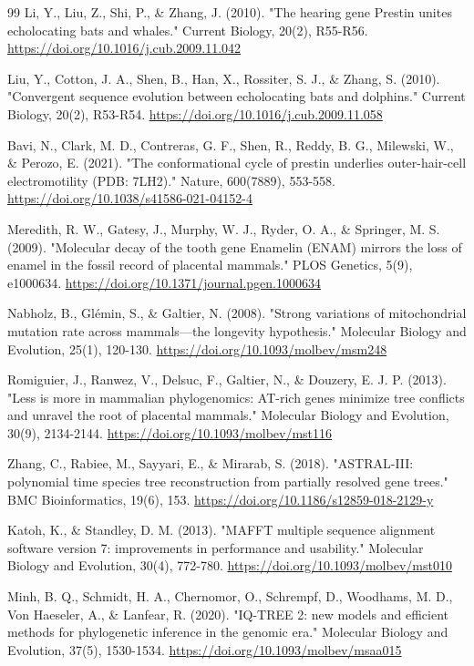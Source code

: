 \documentclass[10pt,letterpaper]{article}
\begin{document}
\begin{thebibliography}{99}
 Li, Y., Liu, Z., Shi, P., \& Zhang, J. (2010). "The hearing gene Prestin unites echolocating bats and whales." Current Biology, 20(2), R55-R56. \url{https://doi.org/10.1016/j.cub.2009.11.042}

 Liu, Y., Cotton, J. A., Shen, B., Han, X., Rossiter, S. J., \& Zhang, S. (2010). "Convergent sequence evolution between echolocating bats and dolphins." Current Biology, 20(2), R53-R54. \url{https://doi.org/10.1016/j.cub.2009.11.058}

 Bavi, N., Clark, M. D., Contreras, G. F., Shen, R., Reddy, B. G., Milewski, W., \& Perozo, E. (2021). "The conformational cycle of prestin underlies outer-hair-cell electromotility (PDB: 7LH2)." Nature, 600(7889), 553-558. \url{https://doi.org/10.1038/s41586-021-04152-4}

 Meredith, R. W., Gatesy, J., Murphy, W. J., Ryder, O. A., \& Springer, M. S. (2009). "Molecular decay of the tooth gene Enamelin (ENAM) mirrors the loss of enamel in the fossil record of placental mammals." PLOS Genetics, 5(9), e1000634. \url{https://doi.org/10.1371/journal.pgen.1000634}

 Nabholz, B., Glémin, S., \& Galtier, N. (2008). "Strong variations of mitochondrial mutation rate across mammals—the longevity hypothesis." Molecular Biology and Evolution, 25(1), 120-130. \url{https://doi.org/10.1093/molbev/msm248}

 Romiguier, J., Ranwez, V., Delsuc, F., Galtier, N., \& Douzery, E. J. P. (2013). "Less is more in mammalian phylogenomics: AT-rich genes minimize tree conflicts and unravel the root of placental mammals." Molecular Biology and Evolution, 30(9), 2134-2144. \url{https://doi.org/10.1093/molbev/mst116}

 Zhang, C., Rabiee, M., Sayyari, E., \& Mirarab, S. (2018). "ASTRAL-III: polynomial time species tree reconstruction from partially resolved gene trees." BMC Bioinformatics, 19(6), 153. \url{https://doi.org/10.1186/s12859-018-2129-y}

 Katoh, K., \& Standley, D. M. (2013). "MAFFT multiple sequence alignment software version 7: improvements in performance and usability." Molecular Biology and Evolution, 30(4), 772-780. \url{https://doi.org/10.1093/molbev/mst010}

 Minh, B. Q., Schmidt, H. A., Chernomor, O., Schrempf, D., Woodhams, M. D., Von Haeseler, A., \& Lanfear, R. (2020). "IQ-TREE 2: new models and efficient methods for phylogenetic inference in the genomic era." Molecular Biology and Evolution, 37(5), 1530-1534. \url{https://doi.org/10.1093/molbev/msaa015}


\end{thebibliography}
\end{document}
